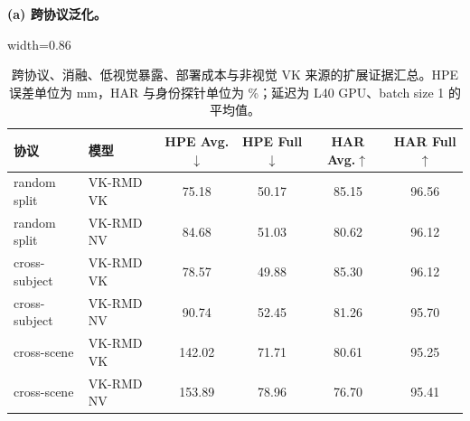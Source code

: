 \documentclass[journal]{IEEEtran}
\begin{document}
\begin{table}[!t]
\centering
\caption{跨协议、消融、低视觉暴露、部署成本与非视觉 VK 来源的扩展证据汇总。HPE 误差单位为 mm，HAR 与身份探针单位为 \%；延迟为 L40 GPU、batch size 1 的平均值。}
\label{tab:extended_add}
\label{tab:protocol_add}
\label{tab:ablation_add}
\label{tab:privacy_add}
\label{tab:iot_add}
\label{tab:generated_vk}
\footnotesize
\textbf{(a) 跨协议泛化。}\par\smallskip
\begin{adjustbox}{width=0.86\textwidth}
\begin{tabular}{llcccc}
\toprule
协议 & 模型 & HPE Avg.$\downarrow$ & HPE Full$\downarrow$ & HAR Avg.$\uparrow$ & HAR Full$\uparrow$ \\
\midrule
random split & VK-RMD VK & 75.18 & 50.17 & 85.15 & 96.56 \\
random split & VK-RMD NV & 84.68 & 51.03 & 80.62 & 96.12 \\
cross-subject & VK-RMD VK & 78.57 & 49.88 & 85.30 & 96.12 \\
cross-subject & VK-RMD NV & 90.74 & 52.45 & 81.26 & 95.70 \\
cross-scene & VK-RMD VK & 142.02 & 71.71 & 80.61 & 95.25 \\
cross-scene & VK-RMD NV & 153.89 & 78.96 & 76.70 & 95.41 \\
\bottomrule
\end{tabular}
\end{adjustbox}


\end{table}
\end{document}
